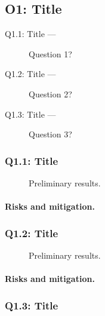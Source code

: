 \documentclass{nsf}
\begin{document}
\subsection{O1: Title}
\label{sec:o1}

\lipsum[1]

\begin{questions}
  \begin{description}
  \item[Q1.1: Title —] Question 1?
  \item[Q1.2: Title —] Question 2?
  \item[Q1.3: Title —] Question 3?
  \end{description}
\end{questions}

\subsubsection{Q1.1: Title}
\label{sec:q11}

\begin{wrapfigure}[14]{r}{.5\textwidth}
  \centering
  \caption{Preliminary results.}
  \label{fig:q11fig}
\end{wrapfigure}
\lipsum[1-3]
\paragraph{Risks and mitigation.}
\lipsum[4]

\subsubsection{Q1.2: Title}
\label{sec:q12}

\begin{wrapfigure}[14]{r}{.5\textwidth}
  \centering
  \caption{Preliminary results.}
  \label{fig:q12fig}
\end{wrapfigure}
\lipsum[1-3]
\paragraph{Risks and mitigation.}
\lipsum[4]

\subsubsection{Q1.3: Title}
\label{sec:q13}
\end{document}
